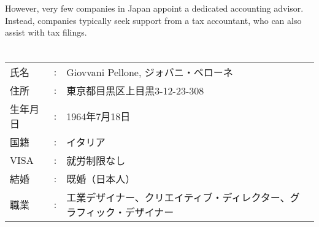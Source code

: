 However, very few companies in Japan appoint a dedicated accounting advisor. Instead, companies typically seek support from a tax accountant, who can also assist with tax filings.

\clearpage









\section{}
\subsection{}

\begin{coloritemize}
\begin{spacing}{0.95}
  \item 
  \item 
  \item 
  \item 
\end{spacing}
\end{coloritemize}

\begin{table}[h]
  \begin{tabular}{lcp{28em}}
    氏名 & : & Giovvani Pellone, ジォバニ・ペローネ \\
    住所 & : & 東京都目黒区上目黒3-12-23-308 \\
    生年月日 & : & 1964年7月18日 \\
    国籍 & : & イタリア \\
    VISA & : & 就労制限なし \\
    結婚 & : & 既婚（日本人） \\
    職業 & : & 工業デザイナー、クリエイティブ・ディレクター、グラフィック・デザイナー \\
  \end{tabular}
\end{table}

